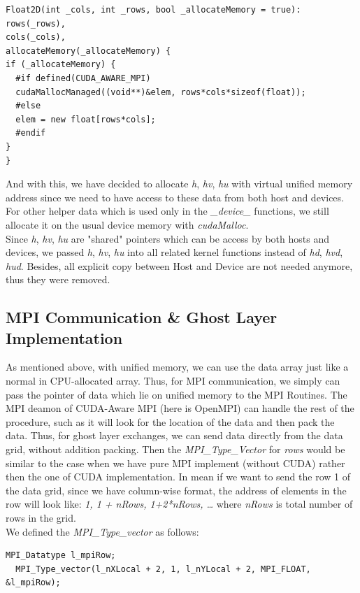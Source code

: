 \documentclass[article]{scrartcl}
\begin{document}
\begin{lstlisting}[frame=single]
Float2D(int _cols, int _rows, bool _allocateMemory = true):
rows(_rows),
cols(_cols),
allocateMemory(_allocateMemory) {
if (_allocateMemory) {
  #if defined(CUDA_AWARE_MPI) 
  cudaMallocManaged((void**)&elem, rows*cols*sizeof(float)); 
  #else 
  elem = new float[rows*cols];
  #endif
}
}
\end{lstlisting}
And with this, we have decided to allocate \textit{h}, \textit{hv}, \textit{hu} with virtual unified memory address since we need to have access to these data from both host and devices. For other helper data which is used only in the \textit{\_device\_} functions, we still allocate it on the usual device memory with \textit{cudaMalloc}. \\
Since \textit{h}, \textit{hv}, \textit{hu} are "shared" pointers which can be access by both hosts and devices, we passed \textit{h}, \textit{hv}, \textit{hu} into all related kernel functions instead of \textit{hd}, \textit{hvd}, \textit{hud}. Besides, all explicit copy between Host and Device are not needed anymore, thus they were removed.

\subsection{MPI Communication \& Ghost Layer Implementation}
\label{mpi_datatype}

As mentioned above, with unified memory, we can use the data array just like a normal in CPU-allocated array. Thus, for MPI communication, we simply can pass the pointer of data which lie on unified memory to the MPI Routines. The MPI deamon of CUDA-Aware MPI (here is OpenMPI) can handle the rest of the procedure, such as it will look for the location of the data and then pack the data. Thus, for ghost layer exchanges, we can send data directly from the data grid, without addition packing. Then the \textit{MPI\_Type\_Vector} for \textit{rows} would be similar to the case when we have pure MPI implement (without CUDA) rather then the one of CUDA implementation. In mean if we want to send the row 1 of the data grid, since we have column-wise format, the address of elements in the row will look like: \textit{1, 1 + nRows, 1+2*nRows, \dots} where \textit{nRows} is total number of rows in the grid. \\
We defined the \textit{MPI\_Type\_vector} as follows:
\begin{lstlisting}[frame=single]
  MPI_Datatype l_mpiRow;
  MPI_Type_vector(l_nXLocal + 2, 1, l_nYLocal + 2, MPI_FLOAT, &l_mpiRow);
\end{lstlisting}
\end{document}
